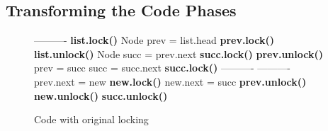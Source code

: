 \subsection{Transforming the Code Phases}\label{ssec:transformation}

\newcommand{\spOne}{\hspace{-3mm}\ }
\newcommand{\spZero}{\hspace{-3mm}}
\begin{figure*}
\codesize
	\begin{center}
	\begin{subfigure}[b]{.44\textwidth}
		\begin{algorithmic}[1]{}
		{\ttfamily
			 \label{code:begin}
			\Statex ----------
			\State                               \label{code:beginRead}
			\State                               
            \State{\spOne}\textbf{list.lock()}
			\State{\spOne}Node prev = list.head
			\State{\spOne}\textbf{prev.lock()}
            \State{\spOne}\textbf{list.unlock()}
			\State{\spOne}Node succ = prev.next
			\State{\spOne}\textbf{succ.lock()}
			\State{\spZero}\textbf{prev.unlock()}
			\State{\spZero}prev = succ
			\State{\spZero}succ = succ.next
			\State{\spZero}\textbf{succ.lock()}  \label{code:endRead}
			\Statex ----------
			\State                               \label{code:beginValidation}
			\State
			\State
			\State
			\State
			\State
			\State
            \State                               \label{code:endValidation}
			\Statex ----------
			\State{\spZero}prev.next = new       \label{code:beginUpdate}
			\State{\spZero}\textbf{new.lock()}
			\State{\spZero}new.next = succ
            \State
			\State{\spZero}\textbf{prev.unlock()}
            \State
			\State{\spZero}\textbf{new.unlock()}
            \State
			\State{\spZero}\textbf{succ.unlock()}  \label{code:endUpdate}
			\EndFunction
			}
		\end{algorithmic}
		\caption{Code with original locking} \label{figure:transformation:before}
	\end{subfigure}
\hspace{0.01\textwidth}
	\begin{subfigure}[b]{.53\textwidth}
		\begin{algorithmic}[1]{}
		{\ttfamily
			 \label{code:begin}
}
\end{algorithmic}
\end{subfigure}
\end{center}
\end{figure*}
